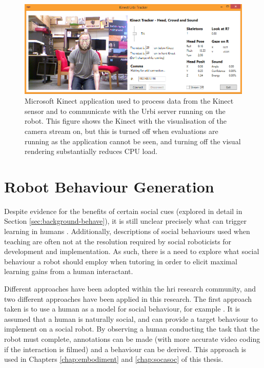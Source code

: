 \begin{figure}[ht]
    \centering
    \includegraphics[width=1.0\textwidth]{images/ch3_kinect_software.png}
    \caption{Microsoft Kinect application used to process data from the Kinect sensor and to communicate with the Urbi server running on the robot. This figure shows the Kinect with the visualisation of the camera stream on, but this is turned off when evaluations are running as the application cannot be seen, and turning off the visual rendering substantially reduces CPU load.}
    \label{fig:ch3_kinect_cruncher}
\end{figure}

\section{Robot Behaviour Generation}\label{sec:method-behave}
Despite evidence for the benefits of certain social cues (explored in detail in Section \ref{sec:background-behave}), it is still unclear precisely what can trigger learning in humans \citep{vanlehn2003only}. Additionally, descriptions of social behaviours used when teaching are often not at the resolution required by social roboticists for development and implementation. As such, there is a need to explore what social behaviour a robot should employ when tutoring in order to elicit maximal learning gains from a human interactant.

Different approaches have been adopted within the \acrshort{hri} research community, and two different approaches have been applied in this research. The first approach taken is to use a human as a model for social behaviour, for example \cite{sharma2013communicating}. It is assumed that a human is naturally social, and can provide a target behaviour to implement on a social robot. By observing a human conducting the task that the robot must complete, annotations can be made (with more accurate video coding if the interaction is filmed) and a behaviour can be derived. This approach is used in Chapters \ref{chap:embodiment} and \ref{chap:socasoc} of this thesis.

